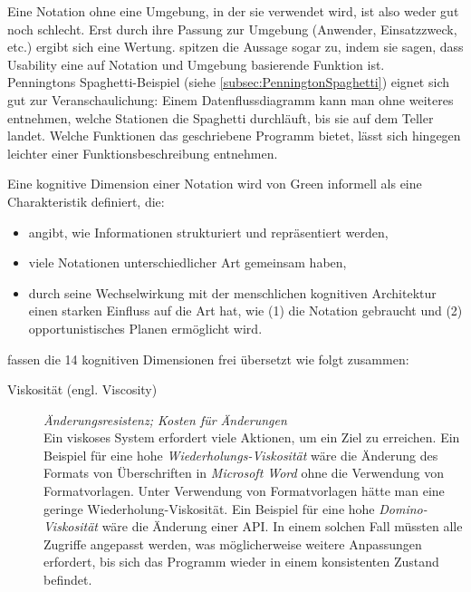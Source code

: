\begin{important}
Eine Notation ohne eine Umgebung, in der sie verwendet wird, ist also weder gut noch schlecht. Erst durch ihre Passung zur Umgebung (Anwender, Einsatzzweck, etc.) ergibt sich eine Wertung. \cite{161956} spitzen die Aussage sogar zu, indem sie sagen, dass Usability eine auf Notation und Umgebung basierende Funktion ist.\\
Penningtons Spaghetti-Beispiel (siehe \ref{subsec:PenningtonSpaghetti}) eignet sich gut zur Veranschaulichung: Einem Datenflussdiagramm kann man ohne weiteres entnehmen, welche Stationen die Spaghetti durchläuft, bis sie auf dem Teller landet. Welche Funktionen das geschriebene Programm bietet, lässt sich hingegen leichter einer Funktionsbeschreibung entnehmen.

\begin{description}
\itemsep1pt\parskip0pt
\item[Kognitive Dimension] Eine kognitive Dimension einer Notation wird von Green informell als eine Charakteristik definiert, die:
    \begin{itemize}
        \item angibt, wie Informationen strukturiert und repräsentiert werden,
        \item viele Notationen unterschiedlicher Art gemeinsam haben,
        \item durch seine Wechselwirkung mit der menschlichen kognitiven Architektur einen starken Einfluss auf die Art hat, wie (1) die Notation gebraucht und (2) opportunistisches Planen ermöglicht wird.
    \end{itemize}
    
    \cite{carroll2003hci} fassen die 14 kognitiven Dimensionen frei übersetzt wie folgt zusammen:
    \begin{description}
        \item[Viskosität (engl. Viscosity)] \textit{Änderungsresistenz; Kosten für Änderungen}\\
        Ein viskoses System erfordert viele Aktionen, um ein Ziel zu erreichen. Ein Beispiel für eine hohe \emph{Wiederholungs-Viskosität} wäre die Änderung des Formats von Überschriften in \textit{Microsoft Word} ohne die Verwendung von Formatvorlagen. Unter Verwendung von Formatvorlagen hätte man eine geringe Wiederholung-Viskosität. Ein Beispiel für eine hohe \emph{Domino-Viskosität} wäre die Änderung einer API. In einem solchen Fall müssten alle Zugriffe angepasst werden, was möglicherweise weitere Anpassungen erfordert, bis sich das Programm wieder in einem konsistenten Zustand befindet.
        

\end{description}
\end{description}
\end{important}
